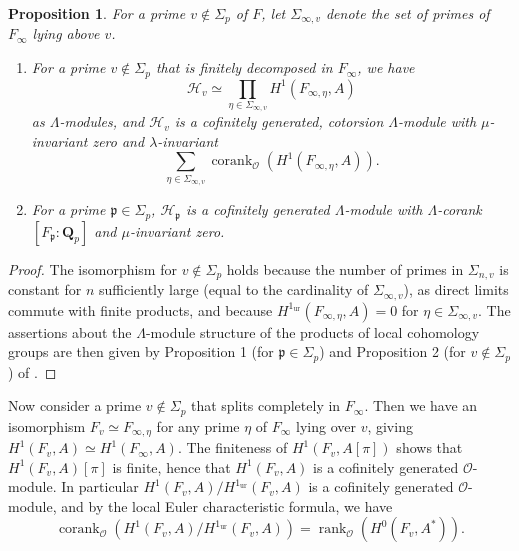 \documentclass[12 pt]{amsart}
\theoremstyle{plain}
\newtheorem{prop}[thm]{Proposition}
\theoremstyle{definition}
\numberwithin{equation}{section}
\numberwithin{table}{section}
\begin{document}
\begin{prop}
\label{fd-structure}
For a prime $v\notin\Sigma_p$ of $F$, let $\Sigma_{\infty,v}$ denote the set of primes of $F_\infty$ lying above $v$.
\label{local-non-split}
\begin{enumerate}
\item For a prime $v\notin\Sigma_p$ that is finitely decomposed in $F_\infty$, we have
\begin{equation*}
\mathcal{H}_v\simeq\prod_{\eta\in\Sigma_{\infty,v}}H^1(F_{\infty,\eta},A)
\end{equation*}
as $\Lambda$-modules, and $\mathcal{H}_v$ is a cofinitely generated, cotorsion $\Lambda$-module with $\mu$-invariant zero and $\lambda$-invariant
\begin{equation*}
\sum_{\eta\in\Sigma_{\infty,v}}\operatorname{corank}_{\mathscr{O}}(H^1(F_{\infty,\eta},A))\text{.}
\end{equation*}
\item For a prime $\mathfrak{p}\in\Sigma_p$, $\mathcal{H}_\mathfrak{p}$ is a cofinitely generated $\Lambda$-module with $\Lambda$-corank $[F_\mathfrak{p}:\mathbf{Q}_p]$ and $\mu$-invariant zero.
\end{enumerate}
\end{prop}
\begin{proof}
The isomorphism for $v\notin\Sigma_p$ holds because the number of primes in $\Sigma_{n,v}$ is constant for $n$ sufficiently large (equal to the cardinality of $\Sigma_{\infty,v}$), as direct limits commute with finite products, and because $H^1_\operatorname{ur}(F_{\infty,\eta},A)=0$ for $\eta\in\Sigma_{\infty,v}$. The assertions about the $\Lambda$-module structure of the products of local cohomology groups are then given by Proposition 1 (for $\mathfrak{p}\in\Sigma_p$) and Proposition 2 (for $v\notin\Sigma_p$) of \cite{GR89}.
\end{proof}
\indent Now consider a prime $v\notin\Sigma_p$ that splits completely in $F_\infty$. Then we have an isomorphism $F_v\simeq F_{\infty,\eta}$ for any prime $\eta$ of $F_\infty$ lying over $v$, giving $H^1(F_v,A)\simeq H^1(F_\infty,A)$. The finiteness of $H^1(F_v,A[\pi])$ shows that $H^1(F_v,A)[\pi]$ is finite, hence that $H^1(F_v,A)$ is a cofinitely generated $\mathscr{O}$-module. In particular $H^1(F_v,A)/H^1_\operatorname{ur}(F_v,A)$ is a cofinitely generated $\mathscr{O}$-module, and by the local Euler characteristic formula, we have
\begin{equation}
\label{eulerchar}
\operatorname{corank}_\mathscr{O}(H^1(F_v,A)/H^1_\operatorname{ur}(F_v,A))=\operatorname{rank}_\mathscr{O}(H^0(F_v,A^*))\text{.}
\end{equation}
\end{document}
